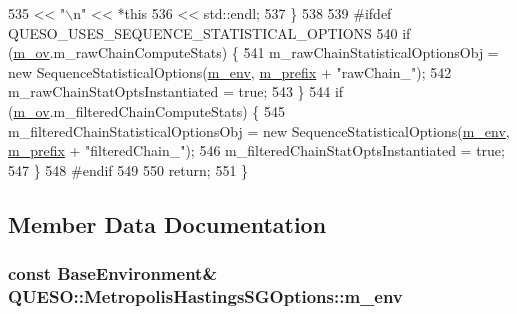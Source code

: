 \begin{DoxyCode}
535                             << \textcolor{stringliteral}{"\(\backslash\)n"} << *\textcolor{keyword}{this}
536                             << std::endl;
537   \}
538 
539 \textcolor{preprocessor}{#ifdef QUESO\_USES\_SEQUENCE\_STATISTICAL\_OPTIONS}
540 \textcolor{preprocessor}{}  \textcolor{keywordflow}{if} (\hyperlink{class_q_u_e_s_o_1_1_metropolis_hastings_s_g_options_a9d4792d9fc2dc5439b8ab489b0c236eb}{m\_ov}.m\_rawChainComputeStats) \{
541     m\_rawChainStatisticalOptionsObj = \textcolor{keyword}{new} SequenceStatisticalOptions(\hyperlink{class_q_u_e_s_o_1_1_metropolis_hastings_s_g_options_a328a978b771885e14d536272ff4aa9ef}{m\_env},
      \hyperlink{class_q_u_e_s_o_1_1_metropolis_hastings_s_g_options_a4f7c510aaa530336d24259e2a89f5d0b}{m\_prefix} + \textcolor{stringliteral}{"rawChain\_"});
542     m\_rawChainStatOptsInstantiated  = \textcolor{keyword}{true};
543   \}
544   \textcolor{keywordflow}{if} (\hyperlink{class_q_u_e_s_o_1_1_metropolis_hastings_s_g_options_a9d4792d9fc2dc5439b8ab489b0c236eb}{m\_ov}.m\_filteredChainComputeStats) \{
545     m\_filteredChainStatisticalOptionsObj = \textcolor{keyword}{new} SequenceStatisticalOptions(\hyperlink{class_q_u_e_s_o_1_1_metropolis_hastings_s_g_options_a328a978b771885e14d536272ff4aa9ef}{m\_env},
      \hyperlink{class_q_u_e_s_o_1_1_metropolis_hastings_s_g_options_a4f7c510aaa530336d24259e2a89f5d0b}{m\_prefix} + \textcolor{stringliteral}{"filteredChain\_"});
546     m\_filteredChainStatOptsInstantiated  = \textcolor{keyword}{true};
547   \}
548 \textcolor{preprocessor}{#endif}
549 \textcolor{preprocessor}{}
550   \textcolor{keywordflow}{return};
551 \}
\end{DoxyCode}


\subsection{Member Data Documentation}
\hypertarget{class_q_u_e_s_o_1_1_metropolis_hastings_s_g_options_a328a978b771885e14d536272ff4aa9ef}{
\subsubsection[{m\-\_\-env}]{\setlength{\rightskip}{0pt plus 5cm}const {\bf Base\-Environment}\& Q\-U\-E\-S\-O\-::\-Metropolis\-Hastings\-S\-G\-Options\-::m\-\_\-env\hspace{0.3cm}{\ttfamily [private]}}}\label{class_q_u_e_s_o_1_1_metropolis_hastings_s_g_options_a328a978b771885e14d536272ff4aa9ef}


